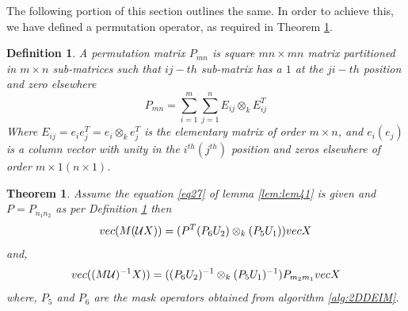 \documentclass{article}
\newtheorem{theorem}{Theorem}
\newtheorem{definition}{Definition}
\begin{document}
The following portion of this section outlines the same. In order to achieve this, we have defined a permutation operator, as required in Theorem \ref{lem:lem62}.
\begin{definition}\label{def:def2}
A permutation matrix $P_{mn}$ is square $mn \times mn$ matrix partitioned in $m \times n$ sub-matrices such that $ij-th$ sub-matrix has a $1$ at the $ji-th$ position and zero elsewhere\cite{KronStat}
\begin{equation*}
    P_{mn}=\sum_{i=1}^m \sum_{j=1}^n E_{ij}\otimes_kE_{ij}^T
\end{equation*}
Where $E_{ij}=e_ie_j^T=e_i\otimes_ke_j^T$ is the elementary matrix of order $m \times n$, and $e_i(e_j)$ is a column vector with unity in the $i^{th} (j^{th})$ position and zeros elsewhere of order $m \times 1 (n \times 1)$.
\end{definition}
\begin{theorem}\label{lem:lem62}
Assume the equation \eqref{eq27} of lemma \ref{lem:lem41} is given and $P=P_{n_1n_2}$ as per Definition \ref{def:def2}  then  
\begin{equation*}
     vec(M(\mathcal{U}X)) = (P^T(P_6U_2) \otimes_k (P_5U_1))vecX\\
\end{equation*}
and,
\begin{equation*}
     vec((M\mathcal{U})^{-1}X)) = ((P_6U_2)^{-1} \otimes_k (P_5U_1)^{-1})P_{m_2m_1}vecX\\
\end{equation*}
 where, $P_5$ and $P_6$ are the mask operators obtained from algorithm \ref{alg:2DDEIM}.
\end{theorem}
\end{document}

